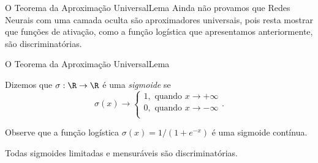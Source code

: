 \documentclass[13pt]{beamer}
\begin{document}
\begin{frame}{O Teorema da Aproximação Universal}{Lema}
    Ainda não provamos que Redes Neurais com uma camada oculta são aproximadores universais, pois resta mostrar que funções de ativação, como a função logística que apresentamos anteriormente, são discriminatórias.
\end{frame}

\begin{frame}{O Teorema da Aproximação Universal}{Lema}
    \begin{defn*}
        Dizemos que \( \sigma : \R \to \R \) é uma \emph{sigmoide} se
        \begin{equation*}
            \sigma ( x ) \to
            \begin{cases}
                1, \text{ quando } x \to + \infty \\
                0, \text{ quando } x \to - \infty \\
            \end{cases}
        .\end{equation*}
    \end{defn*}

    Observe que a função logística \( \sigma ( x ) = 1/( 1 + e^{ -x } ) \) é uma sigmoide contínua.

    \begin{lem*}
        Todas sigmoides limitadas e mensuráveis são discriminatórias.
    \end{lem*}
\end{frame}
\end{document}
